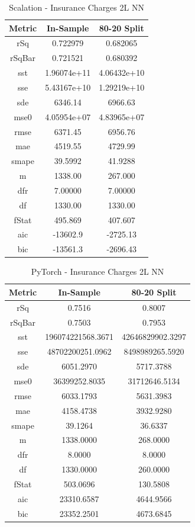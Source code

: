 \documentclass{article}
\begin{document}
\begin{table}[H]
\centering
\caption{Scalation - Insurance Charges 2L NN}
\label{tab:Scalation - Insurance Charges 2L NN}
\begin{tabular}{|c|c|c|} \hline 
Metric & In-Sample & 80-20 Split \\ \hline \hline 
rSq &0.722979 & 0.682065 \\ \hline 
rSqBar &0.721521 &      0.680392 \\ \hline 
sst &1.96074e+11 &      4.06432e+10 \\ \hline 
sse &5.43167e+10 &      1.29219e+10 \\ \hline 
sde &6346.14 &  6966.63 \\ \hline 
mse0 &4.05954e+07 &     4.83965e+07 \\ \hline 
rmse &6371.45 & 6956.76 \\ \hline 
mae &4519.55 &  4729.99 \\ \hline 
smape &39.5992 &        41.9288 \\ \hline 
m &1338.00 &    267.000 \\ \hline 
dfr &7.00000 &  7.00000 \\ \hline 
df &1330.00 &   1330.00 \\ \hline 
fStat &495.869 &        407.607 \\ \hline 
aic &-13602.9 & -2725.13 \\ \hline 
bic &-13561.3 & -2696.43 \\ \hline 
\end{tabular}
\end{table}

\begin{table}[H]
\centering
\caption{PyTorch - Insurance Charges 2L NN}
\label{tab:PyTorch - Insurance Charges 2L NN}
\begin{tabular}{|c|c|c|}\hline
Metric & In-Sample & 80-20 Split \\ \hline \hline
rSq & 0.7516 & 0.8007 \\ \hline
rSqBar & 0.7503 & 0.7953 \\ \hline
sst & 196074221568.3671 & 42646829902.3297 \\ \hline
sse & 48702200251.0962 & 8498989265.5920 \\ \hline
sde & 6051.2970 & 5717.3788 \\ \hline
mse0 & 36399252.8035 & 31712646.5134 \\ \hline
rmse & 6033.1793 & 5631.3983 \\ \hline
mae & 4158.4738 & 3932.9280 \\ \hline
smape & 39.1264 & 36.6337 \\ \hline
m & 1338.0000 & 268.0000 \\ \hline
dfr & 8.0000 & 8.0000 \\ \hline
df & 1330.0000 & 260.0000 \\ \hline
fStat & 503.0696 & 130.5808 \\ \hline
aic & 23310.6587 & 4644.9566 \\ \hline
bic & 23352.2501 & 4673.6845 \\ \hline
\end{tabular}
\end{table}
\end{document}
